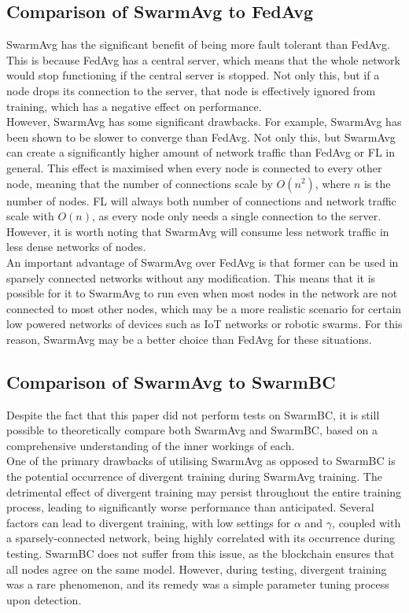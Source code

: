 \documentclass[letterpaper, 10 pt, conference]{ieeeconf}  %
\begin{document}
\subsection{Comparison of SwarmAvg to FedAvg}
SwarmAvg has the significant benefit of being more fault tolerant than FedAvg. This is because FedAvg has a central server, which means that the whole network would stop functioning if the central server is stopped. Not only this, but if a node drops its connection to the server, that node is effectively ignored from training, which has a negative effect on performance. \\

However, SwarmAvg has some significant drawbacks. For example, SwarmAvg has been shown to be slower to converge than FedAvg. Not only this, but SwarmAvg can create a significantly higher amount of network traffic than FedAvg or FL in general. This effect is maximised when every node is connected to every other node, meaning that the number of connections scale by $O(n^2)$, where $n$ is the number of nodes. FL will always both number of connections and network traffic scale with $O(n)$, as every node only needs a single connection to the server. However, it is worth noting that SwarmAvg will consume less network traffic in less dense networks of nodes. \\

An important advantage of SwarmAvg over FedAvg is that former can be used in sparsely connected networks without any modification. This means that it is possible for it to SwarmAvg to run even when most nodes in the network are not connected to most other nodes, which may be a more realistic scenario for certain low powered networks of devices such as IoT networks or robotic swarms. For this reason, SwarmAvg may be a better choice than FedAvg for these situations.

\subsection{Comparison of SwarmAvg to SwarmBC}
Despite the fact that this paper did not perform tests on SwarmBC, it is still possible to theoretically compare both SwarmAvg and SwarmBC, based on a comprehensive understanding of the inner workings of each. \\

One of the primary drawbacks of utilising SwarmAvg as opposed to SwarmBC is the potential occurrence of divergent training during SwarmAvg training. The detrimental effect of divergent training may persist throughout the entire training process, leading to significantly worse performance than anticipated. Several factors can lead to divergent training, with low settings for $\alpha$ and $\gamma$, coupled with a sparsely-connected network, being highly correlated with its occurrence during testing. SwarmBC does not suffer from this issue, as the blockchain ensures that all nodes agree on the same model. However, during testing, divergent training was a rare phenomenon, and its remedy was a simple parameter tuning process upon detection. \\
\end{document}

